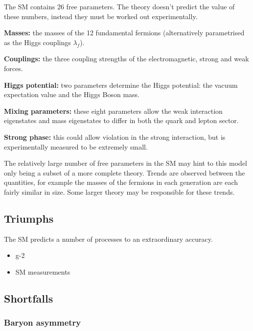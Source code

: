 The SM contains 26 free parameters. The theory doesn't predict the value of these numbers, instead they must be worked out experimentally.  
\begin{description}
\item \textbf{Masses:} the masses of the 12 fundamental fermions (alternatively parametrised as the Higgs couplings $\lambda_{f}$).
\item \textbf{Couplings:} the three coupling strengths of the electromagnetic, strong and weak forces.
\item \textbf{Higgs potential:} two parameters determine the Higgs potential: the vacuum expectation value and the Higgs Boson mass.
\item \textbf{Mixing parameters:} these eight parameters allow the weak interaction eigenstates and mass eigenstates to differ in both the quark and lepton sector.
\item \textbf{Strong \CP  phase:} this could allow \CP violation in the strong interaction, but is experimentally measured to be extremely small.
\end{description}

The relatively large number of free parameters in the SM may hint to this model only being a subset of a more complete theory. Trends are observed between the quantities, for example the masses of the fermions in each generation are each fairly similar in size. Some larger theory may be responsible for these trends.  

\subsection{Triumphs}
The SM predicts a number of processes to an extraordinary accuracy. 

\begin{itemize}
\item g-2
\item SM measurements
\end{itemize}

\subsection{Shortfalls}

\subsubsection{Baryon asymmetry} 

